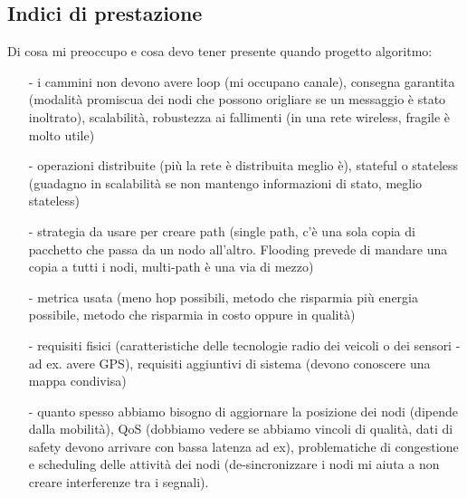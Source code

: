 \documentclass[12pt,italian]{report}
\begin{document}
\subsection{Indici di prestazione}
Di cosa mi preoccupo e cosa devo tener presente quando progetto algoritmo:
\begin{itemize}
    \item [-] i cammini non devono avere loop (mi occupano canale), consegna garantita (modalità promiscua dei nodi che possono origliare se un messaggio è stato inoltrato), scalabilità, robustezza ai fallimenti (in una rete wireless, fragile è molto utile)
    \item [-] operazioni distribuite (più la rete è distribuita meglio è), stateful o stateless (guadagno in scalabilità se non mantengo informazioni di stato, meglio stateless)
    \item [-] strategia da usare per creare path (single path, c'è una sola copia di pacchetto che passa da un nodo all'altro. Flooding prevede di mandare una copia a tutti i nodi, multi-path è una via di mezzo)
    \item [-] metrica usata (meno hop possibili, metodo che risparmia più energia possibile, metodo che risparmia in costo oppure in qualità)
    \item [-] requisiti fisici (caratteristiche delle tecnologie radio dei veicoli o dei sensori - ad ex. avere GPS), requisiti aggiuntivi di sistema (devono conoscere una mappa condivisa)
    \item [-] quanto spesso abbiamo bisogno di aggiornare la posizione dei nodi (dipende dalla mobilità), QoS (dobbiamo vedere se abbiamo vincoli di qualità, dati di safety devono arrivare con bassa latenza ad ex), problematiche di congestione e scheduling delle attività dei nodi (de-sincronizzare i nodi mi aiuta a non creare interferenze tra i segnali).
\end{itemize}
\end{document}
